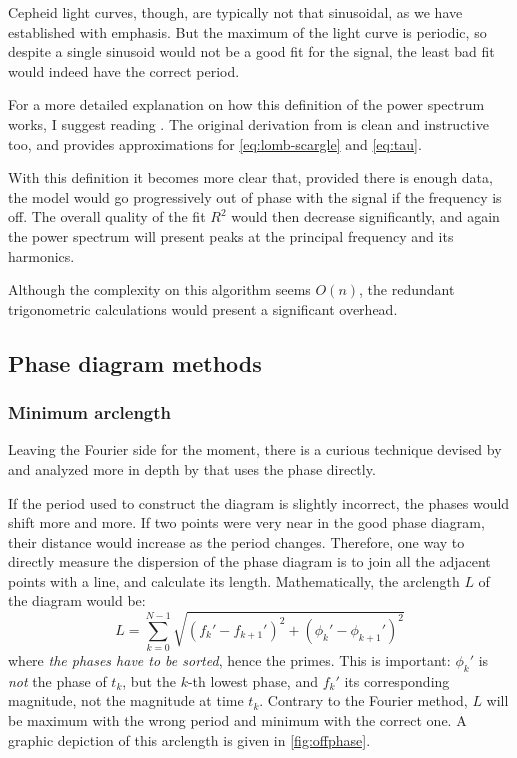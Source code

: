 	Cepheid light curves, though, are typically not that sinusoidal, as we have established with emphasis.
	But the maximum of the light curve is periodic, so despite a single sinusoid would not be a good fit for the signal,
	the least bad fit would indeed have the correct period.
	
	For a more detailed explanation on how this definition of the power spectrum works, I suggest reading \cite{Vanderplas2018}.
	The original derivation from \cite{Lomb1976} is clean and instructive too, and provides approximations for \autoref{eq:lomb-scargle} and \autoref{eq:tau}.
	
	With this definition it becomes more clear that, provided there is enough data, 
	the model would go progressively out of phase with the signal if the frequency is off.
	The overall quality of the fit $R^2$ would then decrease significantly, 
	and again the power spectrum will present peaks at the principal frequency and its harmonics.

	Although the complexity on this algorithm seems $O(n)$, the redundant trigonometric calculations would present a significant overhead.

\subsection{Phase diagram methods \label{sec:phase-diagram-methods}}

	\subsubsection{Minimum arclength}
	
	Leaving the Fourier side for the moment, there is a curious technique devised by \cite{Burke1970} 
	and analyzed more in depth by \cite{Dworetsky1983} that uses the phase directly.
	
	If the period used to construct the diagram is slightly incorrect, the phases would shift more and more.
	If two points were very near in the good phase diagram, their distance would increase as the period changes.
	Therefore, one way to directly measure the dispersion of the phase diagram is to join all the adjacent points with a line, and calculate its length.
	Mathematically, the arclength $L$ of the diagram would be:
	\begin{equation}
		L = \sum_{k=0}^{N-1} \sqrt{(f_k'-f_{k+1}')^2+(\phi_k'-\phi_{k+1}')^2} \label{eq:arclength}
	\end{equation}
	where \textit{the phases have to be sorted}, hence the primes. This is important: $\phi_k'$ is \textit{not} the phase of $t_k$, but the $k$-th lowest phase, 
	and $f_k'$ its corresponding magnitude, not the magnitude at time $t_k$.
	Contrary to the Fourier method, $L$ will be maximum with the wrong period and minimum with the correct one.
	A graphic depiction of this arclength is given in \autoref{fig:offphase}.
	
